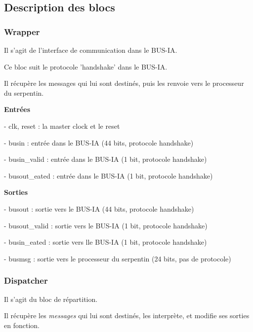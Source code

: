 \documentclass[10pt]{article}
\begin{document}
    \newpage
    \subsection{Description des blocs}
        
        \subsubsection{Wrapper}
        
        Il s'agit de l'interface de communication dans le BUS-IA.
        
        Ce bloc suit le protocole 'handshake' dans le BUS-IA.
        
        Il récupère les messages qui lui sont destinés,
        puis les renvoie vers le processeur du serpentin.
        
        \textbf{Entrées}
        
            - clk, reset : la master clock et le reset
            
            - busin : entrée dans le BUS-IA (44 bits, protocole handshake)
            
            - busin\_valid : entrée dans le BUS-IA (1 bit, protocole handshake)

            - busout\_eated : entrée dans le BUS-IA (1 bit, protocole handshake)
                            
        \textbf{Sorties}
            
            - busout : sortie vers le BUS-IA (44 bits, protocole handshake)
           
            - busout\_valid : sortie vers le BUS-IA (1 bit, protocole handshake)
           
            - busin\_eated : sortie vers lle BUS-IA (1 bit, protocole handshake)

            - busmsg : sortie vers le processeur du serpentin (24 bits, pas de protocole)


        
        \subsubsection{Dispatcher}
        
        Il s'agit du bloc de répartition.
                
        Il récupère les \textit{messages} qui lui sont destinés,
        les interprète, et modifie ses sorties en fonction.
        
\end{document}
